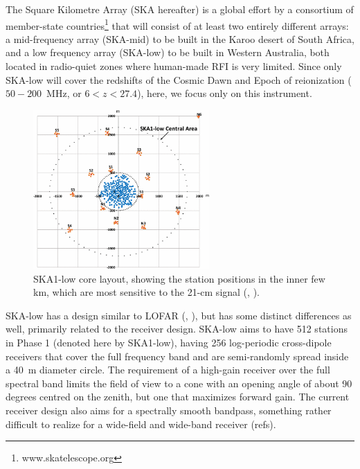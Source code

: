The Square Kilometre Array (SKA hereafter) is a global effort by a consortium of member-state countries\footnote{www.skatelescope.org} that will consist of at least two entirely different arrays: a mid-frequency array  (SKA-mid) to be built in the Karoo desert of South Africa, and a low frequency array (SKA-low) to be built in Western Australia, both located in radio-quiet zones where human-made RFI is very limited. 
Since only SKA-low will cover the redshifts of the Cosmic Dawn and Epoch of reionization ($50-200$~MHz, or $6 < z < 27.4$), here, we focus only on this instrument. 
%
\begin{figure}[]
\begin{center}
\includegraphics[width=0.6\textwidth]{Koopmans_Bernardi/SKA-layout.png}
\end{center}
\caption{SKA1-low core layout, showing the station positions in the inner few km, which are most sensitive to the 21-cm signal (\cite{dewdney09}, \cite{waterson16}).}
\label{fig:fig_ska_layout}
\end{figure}
%
SKA-low has a design similar to LOFAR (\cite{mellema13}, \cite{koopmans15}), but has some distinct differences as well, primarily related to the receiver design. SKA-low aims to have 512 stations in Phase 1 (denoted here by SKA1-low), having 256 log-periodic cross-dipole receivers that cover the full frequency band and are semi-randomly spread inside a 40~m diameter circle. The requirement of a high-gain receiver over the full spectral band limits the field of view to a cone with an opening angle of about 90 degrees centred on the zenith, but one that maximizes forward gain. The current receiver design also aims for a spectrally smooth bandpass, something rather difficult to realize for a wide-field and wide-band receiver (refs).
